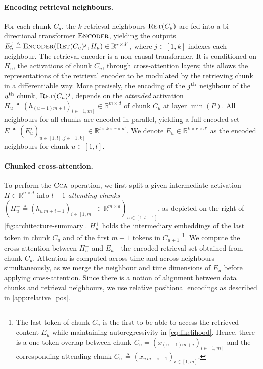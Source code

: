 \paragraph{Encoding retrieval neighbours.} For each chunk $C_u$, the $k$ retrieval neighbours $\textsc{Ret}(C_u)$ are fed into a bi-directional transformer $\textsc{Encoder}$, yielding the outputs $E_u^j \triangleq \textsc{Encoder}(\textsc{Ret}(C_u)^j, H_u) \in \mathbb{R}^{r \times d'}$, where $j \in [1, k]$ indexes each neighbour. The retrieval encoder is a non-causal transformer. It is conditioned on $H_u$, the activations of chunk $C_u$, through cross-attention layers; this allows the representations of the retrieval encoder to be modulated by the retrieving chunk in a differentiable way. More precisely, the encoding of the $j\textsuperscript{th}$ neighbour of the $u\textsuperscript{th}$ chunk, $\textsc{Ret}(C_u)^j$, depends on the \textit{attended} activation $H_u \triangleq {(h_{(u-1) m + i})}_{i \in [1, m]}\in \mathbb{R}^{m \times d}$ of chunk $C_u$ at layer $\min(P)$.
All neighbours for all chunks are encoded in parallel, yielding a full encoded set $E \triangleq {(E_u^j)}_{u \in [1, l], j \in [1, k]} \in \mathbb{R}^{l \times k \times r \times d'}$. We denote $E_u \in \mathbb{R}^{k \times r \times d'}$ as the encoded neighbours for chunk $u \in [1, l]$.

\paragraph{Chunked cross-attention.} To perform the $\textsc{Cca}$ operation, we first split a given intermediate activation $H \in \mathbb{R}^{n \times d}$ into $l{-}1$ \textit{attending chunks} ${\left(H_u^+ \triangleq {(h_{u\,m +i - 1})}_{i \in [1, m]} \in \mathbb{R}^{m \times d} \right)}_{u \in [1, l-1]}$, as depicted on the right of \autoref{fig:architecture-summary}.
$H_u^+$ holds the intermediary embeddings of the last token in chunk $C_u$ and of the first $m-1$ tokens in $C_{u+1}$
\footnote{The last token of chunk $C_u$ is the first to be able to access the retrieved content $E_u$ while maintaining autoregressivity in \eqref{eq:likelihood}. Hence, there is a one token overlap between chunk $C_u =  { \left( x_{(u-1) m + i} \right) }_{i \in [1, m]}$ and the corresponding attending chunk $C_u^+ \triangleq { \left (x_{u \, m + i -1} \right )}_{i \in [1, m]}$. }. We compute the cross-attention between $H_u^+$ and $E_u$---the encoded retrieval set obtained from chunk $C_u$. Attention is computed across time and across neighbours simultaneously, as we merge the neighbour and time dimensions of $E_u$ before applying cross-attention. Since there is a notion of alignment between data chunks and retrieval neighbours, we use relative positional encodings as described in \autoref{app:relative_pos}.

